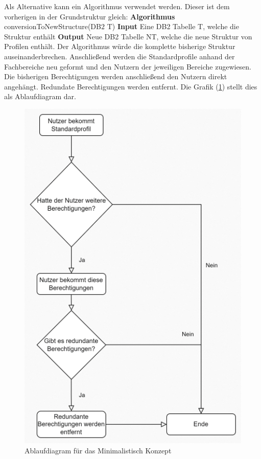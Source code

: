 Als Alternative kann ein Algorithmus verwendet werden.
Dieser ist dem vorherigen in der Grundstruktur gleich:
\newline
\newline
\textbf{Algorithmus} conversionToNewStructure(DB$2$ T)
\newline
\newline
\textbf{Input} Eine DB2 Tabelle T, welche die Struktur enthält
\newline
\newline
\textbf{Output} Neue DB2 Tabelle NT, welche die neue Struktur von Profilen enthält.
\newline
\newline
Der Algorithmus würde die komplette bisherige Struktur auseinanderbrechen.
Anschließend werden die Standardprofile anhand der Fachbereiche neu geformt und den Nutzern der jeweiligen Bereiche zugewiesen.
Die bisherigen Berechtigungen werden anschließend den Nutzern direkt angehängt.
Redundate Berechtigungen werden entfernt.
Die Grafik (\ref{fig:Mini}) stellt dies als Ablaufdiagram dar.
\begin{figure}[h!]
 \centering
 \includegraphics[width=1\textwidth]{gfx/Picture/Mini.PNG}
 \caption{Ablaufdiagram für das Minimalistisch Konzept}
 \label{fig:Mini}
\end{figure}
